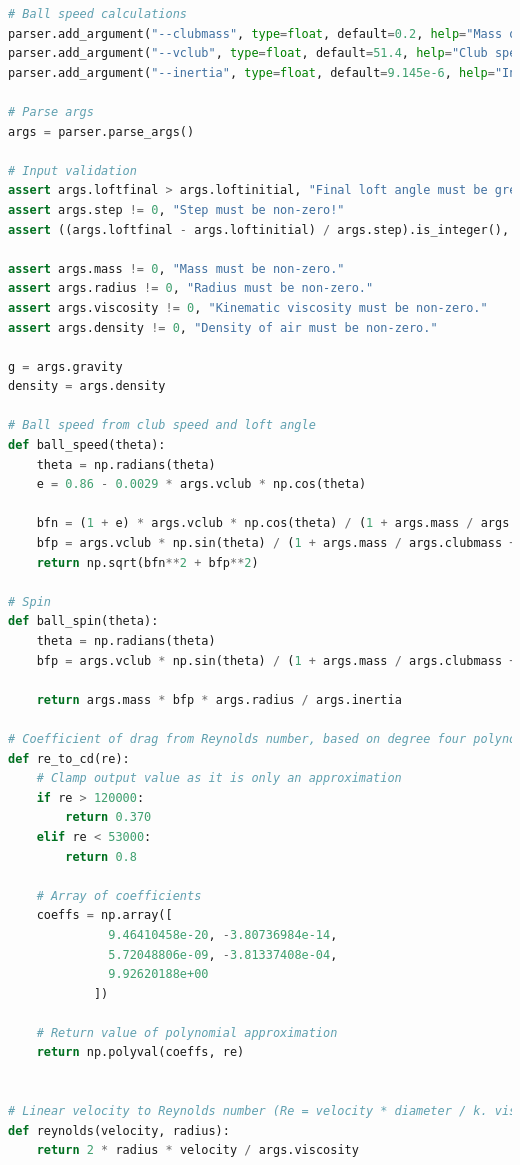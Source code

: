\documentclass[12pt]{article}
\begin{document}
\begin{lstlisting}[language=Python, caption=Python model), style=PythonStyle, basicstyle=\tiny]
# Ball speed calculations
parser.add_argument("--clubmass", type=float, default=0.2, help="Mass of club head (kg)")
parser.add_argument("--vclub", type=float, default=51.4, help="Club speed (m/s)")
parser.add_argument("--inertia", type=float, default=9.145e-6, help="Inertia of golf ball")

# Parse args
args = parser.parse_args()

# Input validation
assert args.loftfinal > args.loftinitial, "Final loft angle must be gretaer than initial loft angle!"
assert args.step != 0, "Step must be non-zero!"
assert ((args.loftfinal - args.loftinitial) / args.step).is_integer(), "Step size must divide the change in loft angle!"

assert args.mass != 0, "Mass must be non-zero."
assert args.radius != 0, "Radius must be non-zero."
assert args.viscosity != 0, "Kinematic viscosity must be non-zero."
assert args.density != 0, "Density of air must be non-zero."

g = args.gravity
density = args.density

# Ball speed from club speed and loft angle
def ball_speed(theta):
	theta = np.radians(theta)
	e = 0.86 - 0.0029 * args.vclub * np.cos(theta)

	bfn = (1 + e) * args.vclub * np.cos(theta) / (1 + args.mass / args.clubmass)
	bfp = args.vclub * np.sin(theta) / (1 + args.mass / args.clubmass + (args.mass * args.radius**2 / args.inertia))
	return np.sqrt(bfn**2 + bfp**2)

# Spin
def ball_spin(theta):
	theta = np.radians(theta)
	bfp = args.vclub * np.sin(theta) / (1 + args.mass / args.clubmass + (args.mass * args.radius**2 / args.inertia))

	return args.mass * bfp * args.radius / args.inertia

# Coefficient of drag from Reynolds number, based on degree four polynomial.
def re_to_cd(re):
	# Clamp output value as it is only an approximation
	if re > 120000:
		return 0.370
	elif re < 53000:
		return 0.8

	# Array of coefficients
	coeffs = np.array([
			  9.46410458e-20, -3.80736984e-14,
			  5.72048806e-09, -3.81337408e-04,
			  9.92620188e+00
			])

	# Return value of polynomial approximation
	return np.polyval(coeffs, re)


# Linear velocity to Reynolds number (Re = velocity * diameter / k. viscosity)
def reynolds(velocity, radius):
	return 2 * radius * velocity / args.viscosity



\end{lstlisting}
\end{document}
